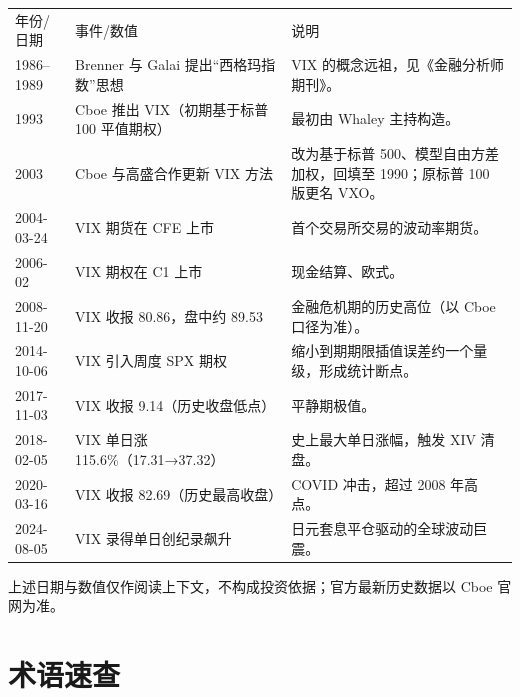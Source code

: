 \documentclass[11pt,a4paper]{ctexart}
\newenvironment{vtable}[1]
  {\begin{longtable}{#1}\toprule}
  {\bottomrule\end{longtable}}
\begin{document}
\begin{vtable}{l >{\raggedright\arraybackslash}p{} >{\raggedright\arraybackslash}p{0.48\textwidth}}
年份/日期 & 事件/数值 & 说明\\
1986--1989 & Brenner 与 Galai 提出“西格玛指数”思想 & VIX 的概念远祖，见《金融分析师期刊》。\\
1993 & Cboe 推出 VIX（初期基于标普 100 平值期权） & 最初由 Whaley 主持构造。\\
2003 & Cboe 与高盛合作更新 VIX 方法 & 改为基于标普 500、模型自由方差加权，回填至 1990；原标普 100 版更名 VXO。\\
2004-03-24 & VIX 期货在 CFE 上市 & 首个交易所交易的波动率期货。\\
2006-02 & VIX 期权在 C1 上市 & 现金结算、欧式。\\
2008-11-20 & VIX 收报 80.86，盘中约 89.53 & 金融危机期的历史高位（以 Cboe 口径为准）。\\
2014-10-06 & VIX 引入周度 SPX 期权 & 缩小到期期限插值误差约一个量级，形成统计断点。\\
2017-11-03 & VIX 收报 9.14（历史收盘低点） & 平静期极值。\\
2018-02-05 & VIX 单日涨 115.6\%（17.31→37.32） & 史上最大单日涨幅，触发 XIV 清盘。\\
2020-03-16 & VIX 收报 82.69（历史最高收盘） & COVID 冲击，超过 2008 年高点。\\
2024-08-05 & VIX 录得单日创纪录飙升 & 日元套息平仓驱动的全球波动巨震。\\
\end{vtable}

上述日期与数值仅作阅读上下文，不构成投资依据；官方最新历史数据以 Cboe 官网为准。

\section{术语速查}
\end{document}
